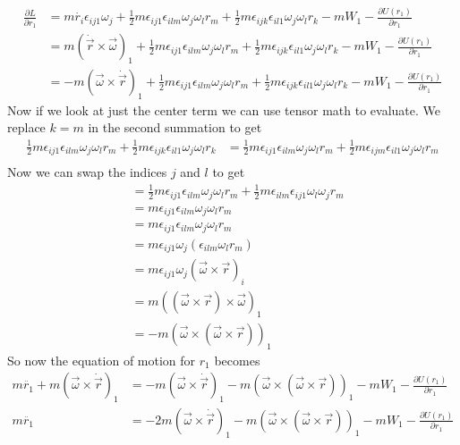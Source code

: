 \documentclass[11pt]{article}
\numberwithin{equation}{section}
\begin{document}
\begin{align*}
\frac{\partial L}{\partial r_1} &= m\dot{r_i}\epsilon_{ij1}\omega_j + \frac{1}{2}m\epsilon_{ij1}\epsilon_{ilm}\omega_j\omega_lr_m + \frac{1}{2}m\epsilon_{ijk}\epsilon_{il1}\omega_j\omega_lr_k - mW_1 -\frac{\partial U(r_1)}{\partial r_1}\\
&= m\left(\dot{\vec{r}}\times\vec{\omega}\right)_1 + \frac{1}{2}m\epsilon_{ij1}\epsilon_{ilm}\omega_j\omega_lr_m + \frac{1}{2}m\epsilon_{ijk}\epsilon_{il1}\omega_j\omega_lr_k - mW_1 -\frac{\partial U(r_1)}{\partial r_1}\\
&= -m\left(\vec{\omega}\times\dot{\vec{r}}\right)_1 + \frac{1}{2}m\epsilon_{ij1}\epsilon_{ilm}\omega_j\omega_lr_m + \frac{1}{2}m\epsilon_{ijk}\epsilon_{il1}\omega_j\omega_lr_k - mW_1 -\frac{\partial U(r_1)}{\partial r_1}
\end{align*}
Now if we look at just the center term we can use tensor math to evaluate. We replace $k=m$ in the second summation to get
\begin{align*}
\frac{1}{2}m\epsilon_{ij1}\epsilon_{ilm}\omega_j\omega_lr_m + \frac{1}{2}m\epsilon_{ijk}\epsilon_{il1}\omega_j\omega_lr_k &= \frac{1}{2}m\epsilon_{ij1}\epsilon_{ilm}\omega_j\omega_lr_m + \frac{1}{2}m\epsilon_{ijm}\epsilon_{il1}\omega_j\omega_lr_m \\
\end{align*}
Now we can swap the indices $j$ and $l$ to get
\begin{align*}
&= \frac{1}{2}m\epsilon_{ij1}\epsilon_{ilm}\omega_j\omega_lr_m + \frac{1}{2}m\epsilon_{ilm}\epsilon_{ij1}\omega_l\omega_jr_m \\
&= m\epsilon_{ij1}\epsilon_{ilm}\omega_j\omega_lr_m \\
&= m\epsilon_{ij1}\epsilon_{ilm}\omega_j\omega_lr_m \\
&= m\epsilon_{ij1}\omega_j(\epsilon_{ilm}\omega_lr_m) \\
&= m\epsilon_{ij1}\omega_j(\vec{\omega}\times\vec{r})_i \\
&= m((\vec{\omega}\times\vec{r})\times\vec{\omega})_1 \\
&= -m\left(\vec{\omega}\times(\vec{\omega}\times\vec{r})\right)_1 
\end{align*}
So now the equation of motion for $r_1$ becomes
\begin{align*}
m\ddot{r_1}+m\left(\vec{\omega}\times\dot{\vec{r}}\right)_1 &= -m\left(\vec{\omega}\times\dot{\vec{r}}\right)_1  -m\left(\vec{\omega}\times(\vec{\omega}\times\vec{r})\right)_1 - mW_1 -\frac{\partial U(r_1)}{\partial r_1}\\
m\ddot{r_1} &= -2m\left(\vec{\omega}\times\dot{\vec{r}}\right)_1  -m\left(\vec{\omega}\times(\vec{\omega}\times\vec{r})\right)_1 - mW_1 -\frac{\partial U(r_1)}{\partial r_1}
\end{align*}
\end{document}
